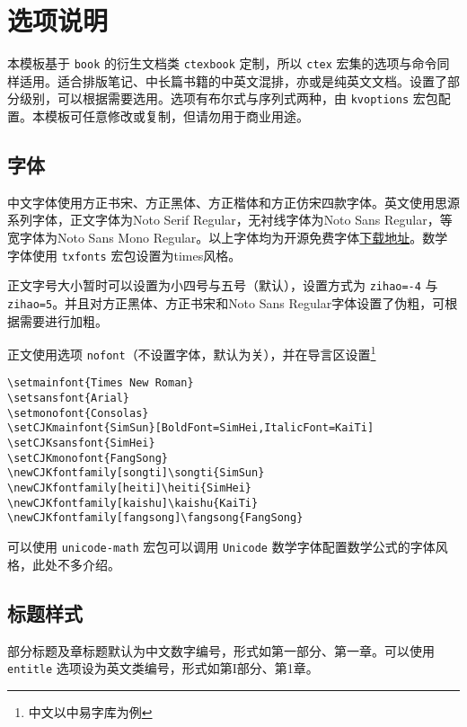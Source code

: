 
\chapter{选项说明}
本模板基于 \lstinline{book} 的衍生文档类 \lstinline{ctexbook} 定制，所以 \lstinline{ctex} 宏集的选项与命令同样适用。适合排版笔记、中长篇书籍的中英文混排，亦或是纯英文文档。设置了\textsf{部分}级别，可以根据需要选用。选项有布尔式与序列式两种，由 \lstinline{kvoptions} 宏包配置。本模板可任意修改或复制，但请勿用于商业用途。

\section{字体}
中文字体使用{\songti 方正书宋}、{\heiti 方正黑体}、{\kaishu 方正楷体}和{\fangsong 方正仿宋}四款字体。英文使用思源系列字体，正文字体为{Noto Serif Regular}，无衬线字体为{Noto Sans Regular}，等宽字体为{Noto Sans Mono Regular}。以上字体均为开源免费字体\href{https://wws.lanzous.com/b01ns361i}{下载地址}。数学字体使用 \lstinline{txfonts} 宏包设置为times风格。

正文字号大小暂时可以设置为小四号与五号（默认），设置方式为 \lstinline{zihao=-4} 与 \lstinline{zihao=5}。并且对{\heiti 方正黑体}、{\songti 方正书宋}和{Noto Sans Regular}字体设置了伪粗，可根据需要进行加粗。

正文使用选项 \lstinline{nofont}（不设置字体，默认为关），并在导言区设置\footnote{中文以中易字库为例}
\begin{lstlisting}[numbers=none]
\setmainfont{Times New Roman}
\setsansfont{Arial}
\setmonofont{Consolas}
\setCJKmainfont{SimSun}[BoldFont=SimHei,ItalicFont=KaiTi]
\setCJKsansfont{SimHei}
\setCJKmonofont{FangSong}
\newCJKfontfamily[songti]\songti{SimSun}
\newCJKfontfamily[heiti]\heiti{SimHei}
\newCJKfontfamily[kaishu]\kaishu{KaiTi}
\newCJKfontfamily[fangsong]\fangsong{FangSong}
\end{lstlisting}

可以使用 \lstinline{unicode-math} 宏包可以调用 \lstinline{Unicode} 数学字体配置数学公式的字体风格，此处不多介绍。

\section{标题样式}
部分标题及章标题默认为中文数字编号，形式如\textsf{第一部分、第一章}。可以使用 \lstinline{entitle} 选项设为英文类编号，形式如\textsf{第I部分、第1章}。

